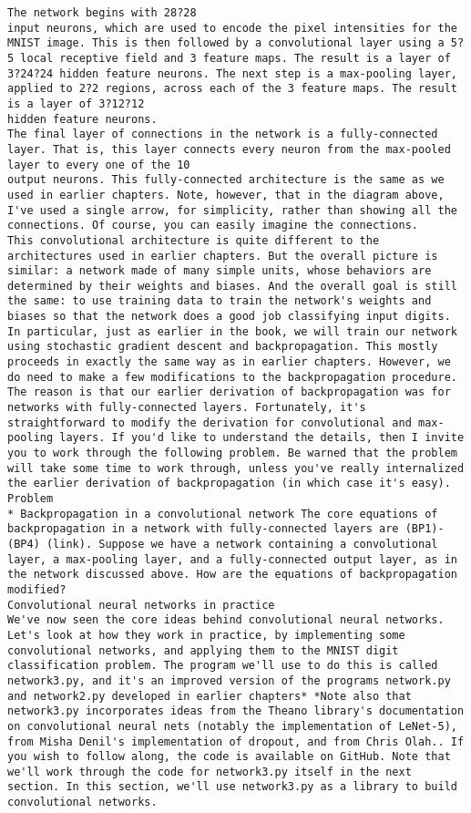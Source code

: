 \begin{lstlisting}
The network begins with 28?28
input neurons, which are used to encode the pixel intensities for the MNIST image. This is then followed by a convolutional layer using a 5?5 local receptive field and 3 feature maps. The result is a layer of 3?24?24 hidden feature neurons. The next step is a max-pooling layer, applied to 2?2 regions, across each of the 3 feature maps. The result is a layer of 3?12?12
hidden feature neurons.
The final layer of connections in the network is a fully-connected layer. That is, this layer connects every neuron from the max-pooled layer to every one of the 10
output neurons. This fully-connected architecture is the same as we used in earlier chapters. Note, however, that in the diagram above, I've used a single arrow, for simplicity, rather than showing all the connections. Of course, you can easily imagine the connections.
This convolutional architecture is quite different to the architectures used in earlier chapters. But the overall picture is similar: a network made of many simple units, whose behaviors are determined by their weights and biases. And the overall goal is still the same: to use training data to train the network's weights and biases so that the network does a good job classifying input digits.
In particular, just as earlier in the book, we will train our network using stochastic gradient descent and backpropagation. This mostly proceeds in exactly the same way as in earlier chapters. However, we do need to make a few modifications to the backpropagation procedure. The reason is that our earlier derivation of backpropagation was for networks with fully-connected layers. Fortunately, it's straightforward to modify the derivation for convolutional and max-pooling layers. If you'd like to understand the details, then I invite you to work through the following problem. Be warned that the problem will take some time to work through, unless you've really internalized the earlier derivation of backpropagation (in which case it's easy).
Problem
* Backpropagation in a convolutional network The core equations of backpropagation in a network with fully-connected layers are (BP1)-(BP4) (link). Suppose we have a network containing a convolutional layer, a max-pooling layer, and a fully-connected output layer, as in the network discussed above. How are the equations of backpropagation modified? 
Convolutional neural networks in practice
We've now seen the core ideas behind convolutional neural networks. Let's look at how they work in practice, by implementing some convolutional networks, and applying them to the MNIST digit classification problem. The program we'll use to do this is called network3.py, and it's an improved version of the programs network.py and network2.py developed in earlier chapters* *Note also that network3.py incorporates ideas from the Theano library's documentation on convolutional neural nets (notably the implementation of LeNet-5), from Misha Denil's implementation of dropout, and from Chris Olah.. If you wish to follow along, the code is available on GitHub. Note that we'll work through the code for network3.py itself in the next section. In this section, we'll use network3.py as a library to build convolutional networks.

\end{lstlisting}
